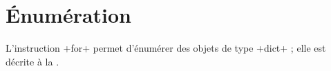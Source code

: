 %
%
%

















\section{Énumération}

L'instruction \ggs+for+ permet d'énumérer des objets de type \ggs+dict+ ; elle est décrite à la .

